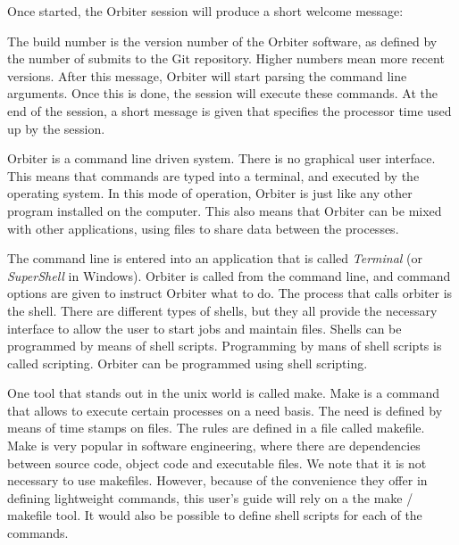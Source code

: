 Once started, the Orbiter session will produce a short welcome message:
\begin{mdframed}[style=MyFrame]

\end{mdframed}
The build number is the version number of the Orbiter software, 
as defined by the number of submits to the Git repository. 
Higher numbers mean more recent versions.
After this message, Orbiter will start parsing the command line arguments. 
Once this is done, the session will execute these commands. 
At the end of the session, a short message is given that specifies the processor time used up by the session.

\bigskip



Orbiter is a command line driven system.
There is no graphical user interface.
This means that commands are typed into a terminal, and executed by the operating system.
In this mode of operation, Orbiter is just like any other program installed on the computer. 
This also means that Orbiter 
can be mixed with other applications, using files to share data between the processes. 

\bigskip


The command line is entered into an application that is called {\em Terminal} (or {\em SuperShell} in Windows).
Orbiter is called from the command line, and command options are given to instruct Orbiter what to do.
The process that calls orbiter is the shell. There are different types of shells, but they all 
provide the necessary interface to allow the user to start jobs and maintain files. 
Shells can be programmed by means of shell scripts. Programming by mans of shell scripts is called scripting. 
Orbiter can be programmed using shell scripting. 


\bigskip


One tool that stands out in the unix world is called make. 
Make is a command that allows to execute certain processes on a need basis. 
The need is defined by means of time stamps on files. The rules are defined in a file called makefile.
Make is very popular in software engineering, 
where there are dependencies between source code, object code and executable files. 
We note that it is not necessary to use makefiles. 
However, because of the convenience they offer in defining lightweight commands, this user's guide 
will rely on a the make / makefile tool.
It would also be possible to define shell scripts for each of the commands.

